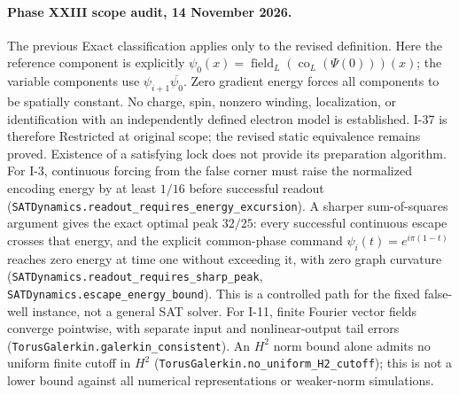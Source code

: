 \documentclass[12pt]{article}
\theoremstyle{remark}
\begin{document}
\paragraph{Phase XXIII scope audit, 14 November 2026.}
The previous Exact classification applies only to the revised definition.
Here the reference component is explicitly
$\psi_0(x)=\operatorname{field}_L(\operatorname{co}_L(\Psi(0)))(x)$;
the variable components use $\psi_{i+1}\overline{\psi_0}$.
Zero gradient energy forces all components to be spatially constant.
No charge, spin, nonzero winding, localization, or identification with
an independently defined electron model is established. I-37 is therefore
Restricted at original scope; the revised static equivalence remains proved.
Existence of a satisfying lock does not provide its preparation algorithm.
For I-3, continuous forcing from the false corner must raise the normalized
encoding energy by at least $1/16$ before successful readout
(\nolinkurl{SATDynamics.readout_requires_energy_excursion}).
A sharper sum-of-squares argument gives the exact optimal peak $32/25$:
every successful continuous escape crosses that energy, and the explicit
common-phase command $\psi_i(t)=e^{i\pi(1-t)}$ reaches zero energy at
time one without exceeding it, with zero graph curvature
(\nolinkurl{SATDynamics.readout_requires_sharp_peak},
\nolinkurl{SATDynamics.escape_energy_bound}). This is a controlled path
for the fixed false-well instance, not a general SAT solver.
For I-11, finite Fourier vector fields converge pointwise, with separate
input and nonlinear-output tail errors
(\nolinkurl{TorusGalerkin.galerkin_consistent}). An $H^2$ norm bound alone
admits no uniform finite cutoff in $H^2$
(\nolinkurl{TorusGalerkin.no_uniform_H2_cutoff}); this is not a lower bound
against all numerical representations or weaker-norm simulations.
\end{document}
